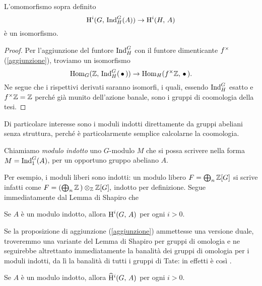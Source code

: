 \begin{lemma}[di Shapiro] \label{Shapiro}
	L'omomorfismo sopra definito
	\[ \operatorname{H}^i(G, \, \operatorname{Ind}_H^G(A)) \to \operatorname{H}^i(H, \, A) \]
	è un isomorfismo.
\end{lemma}
\begin{proof}
	Per l'aggiunzione del funtore $ \operatorname{Ind}_H^G $ con il funtore dimenticante $ f^\times $ (\ref{aggiunzione}), troviamo un isomorfismo
	\[ \operatorname{Hom}_G(\mathbb{Z},\, \operatorname{Ind}_H^G(\,\bullet\, )) \to \operatorname{Hom}_H(f^\times \mathbb{Z}, \, \bullet\, ). \]
	Ne segue che i rispettivi derivati saranno isomorfi, i quali, essendo $ \operatorname{Ind}_H^G $ esatto e $ f^\times\mathbb{Z} =\mathbb{Z} $ perché già munito dell'azione banale, sono i gruppi di coomologia della tesi.
\end{proof}

Di particolare interesse sono i moduli indotti direttamente da gruppi abeliani senza struttura, perché è particolarmente semplice calcolarne la coomologia.

\begin{definition}
	Chiamiamo \emph{modulo indotto} uno $ G $-modulo $ M $ che si possa scrivere nella forma $ M = \operatorname{Ind}_1^G(A) $, per un opportuno gruppo abeliano $ A $.
\end{definition}

Per esempio, i moduli liberi sono indotti: un modulo libero $ F = \bigoplus_n \mathbb{Z}[G] $ si scrive infatti come $ F = \left(\bigoplus_n\mathbb{Z}\,\right) \otimes_{\mathbb{Z}} \mathbb{Z}[G],  $ indotto per definizione.
Segue immediatamente dal Lemma di Shapiro che
\begin{corollary}
	Se $ A $ è un modulo indotto, allora $ \operatorname{H}^i(G, \, A) $ per ogni $ i > 0 $.
\end{corollary}

Se la proposizione di aggiunzione (\ref{aggiunzione}) ammettesse una versione duale, troveremmo una variante del Lemma di Shapiro per gruppi di omologia e ne seguirebbe altrettanto immediatamente la banalità dei gruppi di omologia per i moduli indotti, da lì la banalità di tutti i gruppi di Tate: in effetti è così \cite[lemma 6.3.2]{Weibel}. 
\begin{corollary}\label{indotti}
	Se $ A $ è un modulo indotto, allora $ \operatorname{\widehat{H}^\mathnormal{i}}(G, \, A) $ per ogni $ i > 0 $.
\end{corollary}

